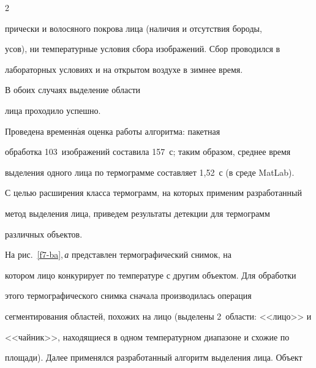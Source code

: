 \begin{multicols}{2}
\addtocounter{figure}{1}










\noindent





\noindent


прически и волосяного покрова лица (наличия и отсутствия бороды, 


усов), ни температурные условия сбора изображений. Сбор проводился в 


лабораторных условиях и на открытом воздухе в зимнее время.


В обоих случаях выделение области 


лица проходило успешно. 





  


  


  Проведена временн$\acute{\mbox{а}}$я оценка работы алгоритма: пакетная 


обработка 103~изображений составила 157~с; таким образом, среднее время 


выделения одного лица по термограмме составляет 1,52~с (в среде MatLab).


  


  С целью расширения класса термограмм, на которых применим разработанный 


метод выделения лица, приведем результаты детекции для термограмм


различных объектов. 


  


  


  На рис.~\ref{f7-ba},\,\textit{а} представлен термографический снимок, на 


котором лицо конкурирует по температуре с другим объектом. Для обработки 


этого термографического снимка сначала производилась операция 


сегментирования областей, похожих на лицо (выделены 2~области: <<лицо>> и 


<<чайник>>, находящиеся в одном температурном диапазоне и схожие по 


площади). Далее применялся разработанный алгоритм выделения лица. Объект 



\end{multicols}
